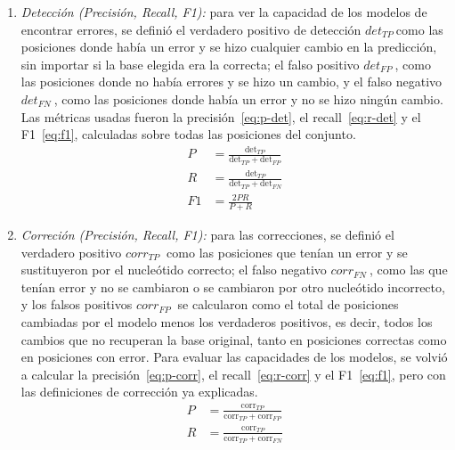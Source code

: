 \documentclass[sigconf,nonacm]{acmart}
\begin{document}
\begin{enumerate}

\item \emph{Detección (Precisión, Recall, F1):} para ver la capacidad de los modelos de encontrar errores, se definió el verdadero positivo de detección \(det_{TP}\ \)como las posiciones donde había un error y se hizo cualquier cambio en la predicción, sin importar si la base elegida era la correcta; el falso positivo \(det_{FP}\ \), como las posiciones donde no había errores y se hizo un cambio, y el falso negativo \(det_{FN}\ \), como las posiciones donde había un error y no se hizo ningún cambio. Las métricas usadas fueron la precisión~\eqref{eq:p-det}, el recall~\eqref{eq:r-det} y el F1~\eqref{eq:f1}, calculadas sobre todas las posiciones del conjunto.
\begin{align}
P &= \frac{\mathrm{det}_{TP}}{\mathrm{det}_{TP} + \mathrm{det}_{FP}} \label{eq:p-det}\\
R &= \frac{\mathrm{det}_{TP}}{\mathrm{det}_{TP} + \mathrm{det}_{FN}} \label{eq:r-det}\\
F1 &= \frac{2PR}{P + R} \label{eq:f1}
\end{align}

\item \emph{Correción (Precisión, Recall, F1):} para las correcciones, se definió el verdadero positivo \(corr_{TP}\ \) como las posiciones que tenían un error y se sustituyeron por el nucleótido correcto; el falso negativo \(corr_{FN}\ \), como las que tenían error y no se cambiaron o se cambiaron por otro nucleótido incorrecto, y los falsos positivos \(corr_{FP}\ \) se calcularon como el total de posiciones cambiadas por el modelo menos los verdaderos positivos, es decir, todos los cambios que no recuperan la base original, tanto en posiciones correctas como en posiciones con error. Para evaluar las capacidades de los modelos, se volvió a calcular la precisión~\eqref{eq:p-corr}, el recall~\eqref{eq:r-corr} y el F1~\eqref{eq:f1}, pero con las definiciones de corrección ya explicadas.
\begin{align}
P &= \frac{\mathrm{corr}_{TP}}{\mathrm{corr}_{TP} + \mathrm{corr}_{FP}} \label{eq:p-corr}\\
R &= \frac{\mathrm{corr}_{TP}}{\mathrm{corr}_{TP} + \mathrm{corr}_{FN}} \label{eq:r-corr}
\end{align}


\end{enumerate}
\end{document}
